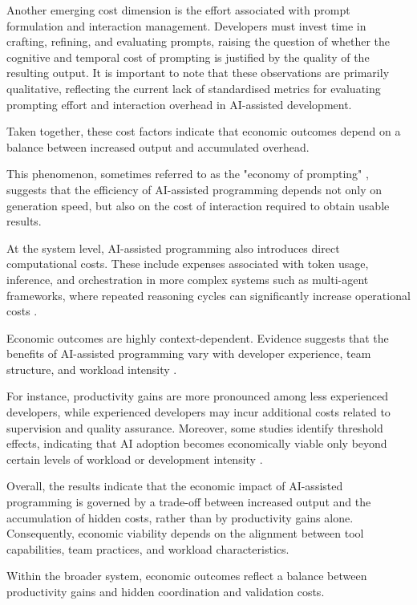 \documentclass[conference]{IEEEtran}
\begin{document}
Another emerging cost dimension is the effort associated with prompt formulation and interaction management. Developers must invest time in crafting, refining, and evaluating prompts, raising the question of whether the cognitive and temporal cost of prompting is justified by the quality of the resulting output.  It is important to note that these observations are primarily qualitative, reflecting the current lack of standardised metrics for evaluating prompting effort and interaction overhead in AI-assisted development.

Taken together, these cost factors indicate that economic outcomes depend on a balance between increased output and accumulated overhead.

This phenomenon, sometimes referred to as the "economy of prompting" \cite{nam_understanding_2025}, suggests that the efficiency of AI-assisted programming depends not only on generation speed, but also on the cost of interaction required to obtain usable results.

At the system level, AI-assisted programming also introduces direct computational costs. These include expenses associated with token usage, inference, and orchestration in more complex systems such as multi-agent frameworks, where repeated reasoning cycles can significantly increase operational costs \cite{yin_comprehensive_2025}.

Economic outcomes are highly context-dependent. Evidence suggests that the benefits of AI-assisted programming vary with developer experience, team structure, and workload intensity \cite{nascimento_comparing_2023, song_impact_2024}.

For instance, productivity gains are more pronounced among less experienced developers, while experienced developers may incur additional costs related to supervision and quality assurance. Moreover, some studies identify threshold effects, indicating that AI adoption becomes economically viable only beyond certain levels of workload or development intensity \cite{rodriguez_comparative_2025}.

Overall, the results indicate that the economic impact of AI-assisted programming is governed by a trade-off between increased output and the accumulation of hidden costs, rather than by productivity gains alone. Consequently, economic viability depends on the alignment between tool capabilities, team practices, and workload characteristics.

Within the broader system, economic outcomes reflect a balance between productivity gains and hidden coordination and validation costs.
\end{document}
